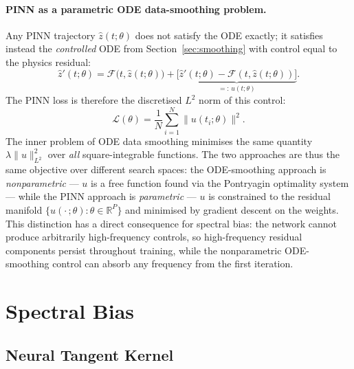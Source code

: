 \documentclass{article}
\begin{document}
\paragraph{PINN as a parametric ODE data-smoothing problem.}
Any PINN trajectory $\hat{z}(t;\theta)$ does not satisfy the ODE exactly; it
satisfies instead the \emph{controlled} ODE from Section~\ref{sec:smoothing}
with control equal to the physics residual:
\begin{equation}
    \hat{z}'(t;\theta)
    = \mathcal{F}\bigl(t,\hat{z}(t;\theta)\bigr)
    + \underbrace{\bigl[\hat{z}'(t;\theta)-\mathcal{F}(t,\hat{z}(t;\theta))\bigr]}_{=:\,u(t;\theta)}.
\end{equation}
The PINN loss is therefore the discretised $L^2$ norm of this control:
\begin{equation}
    \mathcal{L}(\theta)
    = \frac{1}{N}\sum_{i=1}^{N}\|u(t_i;\theta)\|^2.
\end{equation}
The inner problem of ODE data smoothing minimises the same quantity
$\lambda\|u\|^2_{L^2}$ over \emph{all} square-integrable functions.  The two
approaches are thus the same objective over different search spaces:
the ODE-smoothing approach is \emph{nonparametric} — $u$ is a free function
found via the Pontryagin optimality system — while the PINN approach is
\emph{parametric} — $u$ is constrained to the residual manifold
$\{u(\cdot\,;\theta):\theta\in\mathbb{R}^P\}$ and minimised by gradient
descent on the weights.  This distinction has a direct consequence for
spectral bias: the network cannot produce arbitrarily high-frequency controls,
so high-frequency residual components persist throughout training, while the
nonparametric ODE-smoothing control can absorb any frequency from the first
iteration.

\section{Spectral Bias}

\subsection{Neural Tangent Kernel}
\end{document}
